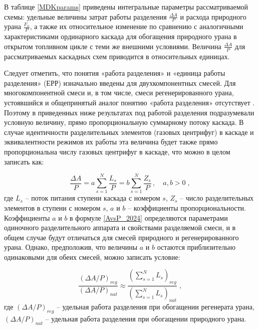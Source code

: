 В таблице \ref{MDKparams} приведены интегральные параметры рассматриваемой схемы: удельные величины затрат работы разделения $\frac{\Delta A}{P}$ и расхода природного урана $\frac{F_n}{P}$, а также их относительное изменение по сравнению с аналогичными характеристиками ординарного каскада для обогащения природного урана в открытом топливном цикле с теми же внешними условиями. Величина $\frac{\Delta A}{P}$ для рассматриваемых каскадных схем приводится в относительных единицах.

Следует отметить, что понятия «работа разделения» и «единица работы разделения» (ЕРР) изначально введены для двухкомпонентных смесей. Для многокомпонентной смеси и, в том числе, смеси регенерированного урана, устоявшийся и общепринятый аналог понятию «работа разделения» отсутствует \cite{2024sep_potential_ifz}. Поэтому в приведенных ниже результатах под работой разделения подразумевали условную величину, прямо пропорциональную суммарному потоку каскада. В случае идентичности разделительных элементов (газовых центрифуг) в каскаде и эквивалентности режимов их работы эта величина будет также прямо пропорциональна числу газовых центрифуг в каскаде, что можно в целом записать как:

\begin{equation}\label{AvsP_2024}
  \frac{\Delta A}{P}=a\sum_{s=1}^N \frac{L_s}{P}=b\sum_{s=1}^N \frac{Z_s}{P} \, ,\quad a,b>0 \; ,
\end{equation}
где $L_s$ -- поток питания ступени каскада с номером $s$, $Z_s$ --  число разделительных элементов в ступени с номером $s$, $a$ и $b$ -- коэффициенты пропорциональности. Коэффициенты $a$ и $b$ в формуле \ref{AvsP_2024} определяются параметрами одиночного разделительного аппарата и свойствами разделяемой смеси, и в общем случае будут отличаться для смесей природного и регенерированного урана. Однако, предположив, что величины $a$ и $b$ остаются приблизительно одинаковыми для обеих смесей, можно записать условие:

\begin{equation}\label{AvsP_regnat_2024}
  \frac{(\Delta A/P)_{reg}}{(\Delta A/P)_{nat}} \approx \frac{(\sum_{s=1}^N L_s)_{reg}}{(\sum_{s=1}^N L_s)_{nat}} \; ,
\end{equation}
где $(\Delta A/P)_{reg}$ -- удельная работа разделения при обогащении регенерата урана,  $(\Delta A/P)_{nat}$ -- удельная работа разделения при обогащении природного урана.

